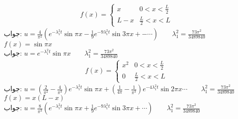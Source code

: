 \begin{align*}
f(x)=
\begin{cases}
x&0<x<\frac{L}{2}\\
L-x&\frac{L}{2}<x<L
\end{cases}
\end{align*}
جواب:\quad
$u=\tfrac{4}{\pi^2}(e^{-\lambda_1^2 t}\sin \pi x-\tfrac{1}{9}e^{-9\lambda_1^2 t}\sin 3\pi x+-\cdots)\quad \quad \lambda_1^2=\tfrac{73\pi^2}{3489840}$
\quad
$f(x)=\sin \pi x$\\
جواب:\quad
$u=e^{-\lambda_1^2 t}\sin \pi x\quad \quad \lambda_1^2=\tfrac{73\pi^2}{3489840}$
\quad
\begin{align*}
f(x)=
\begin{cases}
x^2&0<x<\frac{L}{2}\\
0&\frac{L}{2}<x<L
\end{cases}
\end{align*}
جواب:\quad
$u=(\tfrac{2}{\pi^2}-\tfrac{4}{\pi^3})e^{-\lambda_1^2t}\sin\pi x+(\tfrac{1}{4\pi}-\tfrac{1}{\pi^3})e^{-4\lambda_1^2t}\sin 2\pi x\cdots \quad \quad \lambda_1^2=\tfrac{73\pi^2}{3489840}$
\quad
$f(x)=x(L-x)$\\
جواب:\quad
$u=\tfrac{8}{\pi^3}(e^{-\lambda_1^2t}\sin \pi x+\tfrac{1}{9}e^{-9\lambda_1^2t}\sin 3\pi x+\cdots)\quad \quad \lambda_1^2=\tfrac{73\pi^2}{3489840}$

